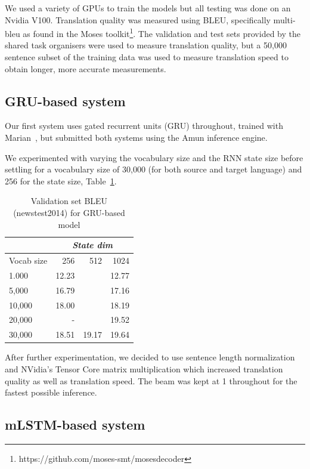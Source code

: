 \documentclass[11pt,a4paper]{article}
\begin{document}
We used a variety of GPUs to train the models but all testing was done on an Nvidia V100. Translation quality was measured using BLEU, specifically multi-bleu as found in the Moses toolkit\footnote{https://github.com/moses-smt/mosesdecoder}. The validation and test sets provided by the shared task organisers were used to measure translation quality, but a 50,000 sentence subset of the training data was used to measure translation speed to obtain longer, more accurate measurements.

\subsection{GRU-based system}

Our first system uses gated recurrent units (GRU) throughout, trained with Marian~\citep{junczys2018marian}, but submitted both systems using the Amun inference engine.

We experimented with varying the vocabulary size and the RNN state size before settling for a vocabulary size of 30,000 (for both source and target language) and 256 for the state size, Table~\ref{tab:BLEU for newstest2014}.

\begin{table}
\begin{center}
\begin{tabular}{|l|r|r|r|} \hline
		& \multicolumn{3}{|c|}{\emph{State dim}}	\\ \hline	
Vocab size	& 256	& 512	& 1024 \\ \hline
1.000 		& 12.23 &	& 12.77 \\ 
5,000		& 16.79	&  	& 17.16 \\ 
10,000		& 18.00	& 	& 18.19 \\
20,000		& -	&	& 19.52 \\ 
30,000		& 18.51	& 19.17	& 19.64 \\ \hline
\end{tabular}
\end{center}
\caption{Validation set BLEU (newstest2014) for GRU-based model}
\label{tab:BLEU for newstest2014}
\end{table}

After further experimentation, we decided to use sentence length normalization and NVidia's Tensor Core matrix multiplication which increased translation quality as well as translation speed. The beam was kept at 1 throughout for the fastest possible inference.

\subsection{mLSTM-based system}
\end{document}
